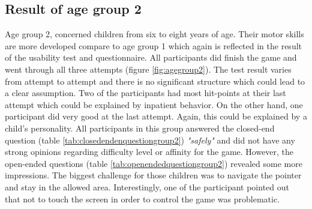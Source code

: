 \newpage

\subsection{Result of age group 2}
Age group 2, concerned children from six to eight years of age. Their motor skills are more developed compare to age group 1 which again is reflected in the result of the usability test and questionnaire. All participants did finish the game and went through all three attempts (figure \ref{fig:agegroup2}). The test result varies from attempt to attempt and there is no significant structure which could lead to a clear assumption. Two of the participants had most hit-points at their last attempt which could be explained by inpatient behavior. On the other hand, one participant did very good at the last attempt. Again, this could be explained by a child's personality.
All participants in this group answered the closed-end question (table \ref{tab:closedendenquestiongroup2}) \textit{"safely"} and did not have any strong opinions regarding difficulty level or affinity for the game. However, the open-ended questions (table \ref{tab:openendedquestiongroup2}) revealed some more impressions. The biggest challenge for those children was to navigate the pointer and stay in the allowed area. Interestingly, one of the participant pointed out that not to touch the screen in order to control the game was problematic. 



